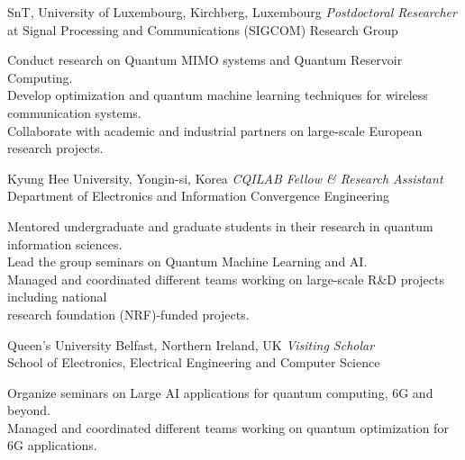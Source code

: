 \documentclass[10pt]{article}
\begin{document}
\begin{mylist}

\item
{}
{SnT,  University of Luxembourg, Kirchberg, Luxembourg}
{\emph{Postdoctoral Researcher} at 
    Signal Processing and Communications (SIGCOM) Research Group
}
{\vspace*{-5mm}
\begin{tabbing}
    Conduct research on Quantum MIMO systems and Quantum Reservoir Computing.\\
    Develop optimization and quantum machine learning techniques for wireless communication systems.\\
    Collaborate with academic and industrial partners on large-scale European research projects.
\end{tabbing}
}


\item
{}
{Kyung Hee University, Yongin-si, Korea}
{\emph{CQILAB Fellow \&  Research Assistant}\\
	Department of Electronics and Information Convergence Engineering%
}
{\vspace*{-5mm}
	\begin{tabbing}
		Mentored undergraduate and graduate students in their research in quantum information sciences.\\
		Lead the group seminars on Quantum Machine Learning and AI. \\
  Managed and coordinated different teams working on large-scale R\&D projects including national\\ research foundation (NRF)-funded projects.
	\end{tabbing}}

\item
{Queen's University Belfast, Northern Ireland, UK}
{\emph{Visiting Scholar}\\
	 School of Electronics, Electrical Engineering and Computer Science%
}
{\vspace*{-5mm}
	\begin{tabbing}
	   Organize seminars on Large AI applications for quantum computing, 6G and beyond. \\
  Managed and coordinated different teams working on quantum optimization for 6G applications.
	\end{tabbing}}




\end{mylist}
\end{document}
